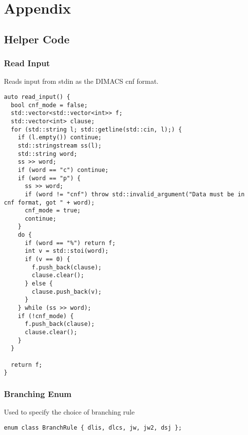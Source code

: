 \documentclass[10pt,AMS Euler]{article}
\begin{document}
\section*{Appendix}
\label{sec:org958965b}
\subsection*{Helper Code}
\label{sec:org36374a2}
\subsubsection*{Read Input}
\label{sec:org2583be7}
Reads input from stdin as the DIMACS cnf format.
\begin{verbatim}
auto read_input() {
  bool cnf_mode = false;
  std::vector<std::vector<int>> f;
  std::vector<int> clause;
  for (std::string l; std::getline(std::cin, l);) {
    if (l.empty()) continue;
    std::stringstream ss(l);
    std::string word;
    ss >> word;
    if (word == "c") continue;
    if (word == "p") {
      ss >> word;
      if (word != "cnf") throw std::invalid_argument("Data must be in cnf format, got " + word);
      cnf_mode = true;
      continue;
    }
    do {
      if (word == "%") return f;
      int v = std::stoi(word);
      if (v == 0) {
        f.push_back(clause);
        clause.clear();
      } else {
        clause.push_back(v);
      }
    } while (ss >> word);
    if (!cnf_mode) { 
      f.push_back(clause);
      clause.clear();
    }
  }
  
  return f;
}
\end{verbatim}
\subsubsection*{Branching Enum}
\label{sec:org0ca2c38}
Used to specify the choice of branching rule
\begin{verbatim}
enum class BranchRule { dlis, dlcs, jw, jw2, dsj };
\end{verbatim}
\end{document}
